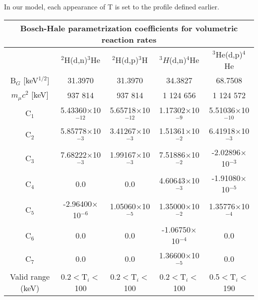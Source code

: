 In our model, each appearance of T is set to the profile defined earlier.

\begin{table}[h!]\small
  \noindent
  \centering
  \begin{tabular}{c | c c | c | c}
    \multicolumn{5}{c}{Bosch-Hale parametrization coefficients for volumetric reaction rates}\\
    \hline
    & $^2$H(d,n)$^3$He & $^2$H(d,p)$^3$H & $^3H$(d,n)$^4$He & $^3$He(d,p)$^4$He\\
    \hline\hline
    B$_G$ [keV$^{1/2}$] & 31.3970 & 31.3970 & 34.3827   & 68.7508 \\
    $m_\mu c^2$ [keV]   & 937 814 & 937 814 & 1 124 656 & 1 124 572 \\
    \hline
    C$_1$& 5.43360$\times$10$^{-12}$  & 5.65718$\times$10$^{-12}$ & 1.17302$\times$10$^{-9}$  & 5.51036$\times$10$^{-10}$ \\ 
    C$_2$  & 5.85778$\times$10$^{-3}$   & 3.41267$\times$10$^{-3}$  & 1.51361$\times$10$^{-2}$  & 6.41918$\times$10$^{-3}$ \\
    C$_3$  & 7.68222$\times$10$^{-3}$   & 1.99167$\times$10$^{-3}$  & 7.51886$\times$10$^{-2}$  & -2.02896$\times$10$^{-3}$ \\
    C$_4$  & 0.0                        & 0.0                       & 4.60643$\times$10$^{-3}$  & -1.91080$\times$10$^{-5}$ \\
    C$_5$  & -2.96400$\times$10$^{-6}$  & 1.05060$\times$10$^{-5}$  & 1.35000$\times$10$^{-2}$  & 1.35776$\times$10$^{-4}$ \\
    C$_6$  & 0.0                        & 0.0                       & -1.06750$\times$10$^{-4}$ & 0.0 \\
    C$_7$& 0.0                      & 0.0                       & 1.36600$\times$10$^{-5}$  & 0.0 \\
    \hline
    Valid range (keV) & 0.2$<$T$_i<$100 & 0.2$<$T$_i<$100 & 0.2$<$T$_i<$100 & 0.5$<$T$_i<$190\\
    \hline
  \end{tabular}
  \label{table:rrParam}
\end{table}

